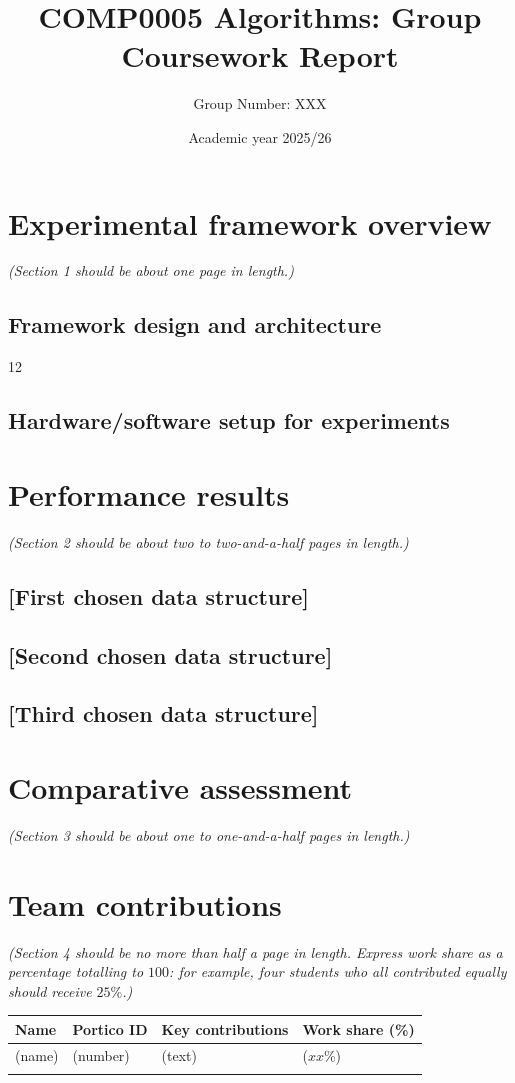 \documentclass[12pt]{article}
\begin{document}
\title{COMP0005 Algorithms: Group Coursework Report}
\author{Group Number: XXX}
\date{Academic year 2025/26}
\maketitle



\section{Experimental framework overview}
\emph{(Section 1 should be about one page in length.)}

\subsection{Framework design and architecture}
12
\subsection{Hardware/software setup for experiments}




\section{Performance results}
\emph{(Section 2 should be about two to two-and-a-half pages in length.)}

\subsection{[First chosen data structure]}

\subsection{[Second chosen data structure]}

\subsection{[Third chosen data structure]}




\section{Comparative assessment}
\emph{(Section 3 should be about one to one-and-a-half pages in length.)}



\section{Team contributions}
\emph{(Section 4 should be no more than half a page in length. Express work share as a percentage totalling to $100$: for example, four students who all contributed equally should receive $25\%$.)}


\vspace{1cm}

\begin{tabular}{|l|l|l|l|}
\hline
{\bf Name} & {\bf Portico ID} & {\bf Key contributions} & {\bf Work share (\%)} \\[1mm]
\hline
(name)    &  (number)  & (text) & ($xx\%$) \\\hline
          &            &         &          \\
\hline
\end{tabular}
\end{document}
